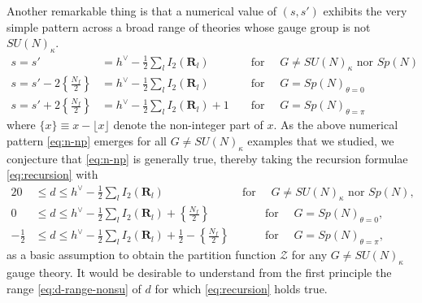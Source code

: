 \documentclass[letterpaper, 11pt]{article}
\newcommand{\nn}{\nonumber}
\def\k{\kappa}
\begin{document}
{Another remarkable thing is that a numerical value of  $(s, s')$ exhibits the very simple pattern across a broad range of theories whose gauge group is not $SU(N)_\k$. %
\begin{align}
  \label{eq:n-np}
 s = s' &= h^\vee - \frac{1}{2} \sum_{l}I_2(\mathbf{R}_l)  && \text{ for } \quad   G\neq SU(N)_\kappa \text{ nor } Sp(N) \nn \\
 s = s' - 2\left\{\frac{N_f}{2} \right\} &= h^\vee - \frac{1}{2} \sum_{l}I_2(\mathbf{R}_l)
 &&   \text{ for }  \quad G = Sp(N)_{\theta=0}\\
 s = s' + 2 \left\{\frac{N_f}{2} \right\} &= h^\vee - \frac{1}{2} \sum_{l}I_2(\mathbf{R}_l) + 1 &&   \text{ for }  \quad G = Sp(N)_{\theta=\pi} \nn
\end{align}
where $\{ x\} \equiv x - \lfloor x \rfloor $ denote the non-integer part of $x$.
As the above numerical pattern \eqref{eq:n-np} emerges for all $G \neq SU(N)_\k$ examples that we studied, we conjecture that \eqref{eq:n-np} is generally true, thereby taking the recursion formulae \eqref{eq:recursion} with
\begin{alignat}{2}
 \label{eq:d-range-nonsu}
  0 & \leq d \leq h^\vee - \frac{1}{2} \sum_{l}I_2(\mathbf{R}_l)  & \text{ for } \quad G \neq SU(N)_\kappa \text{ nor } Sp(N),  \nn \\
  0 &\leq  d \leq h^\vee - \frac{1}{2} \sum_{l}I_2(\mathbf{R}_l) + \left\{\frac{N_f}{2} \right\} & \qquad \text{ for }\quad G =Sp(N)_{\theta=0}, \\
  -\frac{1}{2} &\leq  d \leq h^\vee - \frac{1}{2} \sum_{l}I_2(\mathbf{R}_l) + \frac{1}{2} - \left\{\frac{N_f}{2} \right\} & \qquad \text{ for }\quad G =Sp(N)_{\theta=\pi}, \nn
\end{alignat}
as a basic assumption to obtain the partition function $\mathcal{Z}$ for any $G \neq SU(N)_\k$ gauge theory. 
It would be desirable to understand from the first principle the range  \eqref{eq:d-range-nonsu} of $d$ for which \eqref{eq:recursion} holds true.

}
\end{document}
